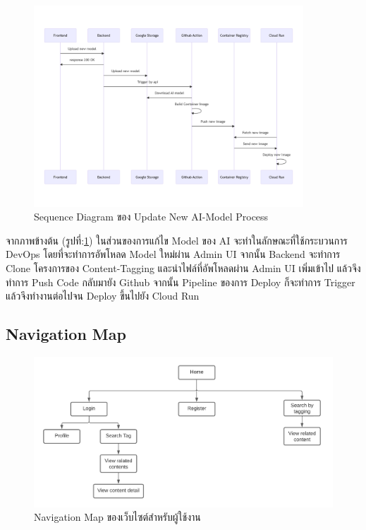 \documentclass[12pt,oneside,openright,a4paper]{cpe-thai-project}
\begin{document}
  \begin{figure}[!ht]\centering
    \includegraphics[width=0.9\textwidth]{./img/ai_update.png}
    \caption{Sequence Diagram ของ Update New AI-Model Process}\label{fig:ai_update} 
  \end{figure}
  
  \hspace{1cm} จากภาพข้างต้น (รูปที่:\ref{fig:ai_update}) ในส่วนของการแก้ไข Model ของ AI จะทำในลักษณะที่ใช้กระบวนการ DevOps โดยที่จะทำการอัพโหลด Model ใหม่ผ่าน Admin UI 
  จากนั้น Backend จะทำการ Clone โครงการของ Content-Tagging และนำไฟล์ที่อัพโหลดผ่าน Admin UI เพิ่มเข้าไป แล้วจึงทำการ Push Code กลับมายัง Github 
  จากนั้น Pipeline ของการ Deploy ก็จะทำการ Trigger แล้วจึงทำงานต่อไปจน Deploy ขึ้นไปยัง Cloud Run 

\subsection{Navigation Map}
  \begin{figure}[!ht]\centering
    \includegraphics[width=13cm]{./img/nav.png}
    \caption{Navigation Map ของเว็บไซต์สำหรับผู้ใช้งาน}\label{fig:navmap} 
  \end{figure}
\end{document}
